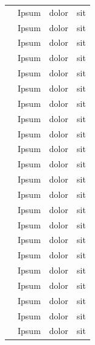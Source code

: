 \documentclass{article}
\begin{document}
\begin{longtable}{p{6.5cm}p{3.5cm}p{0.3cm}p{0.5cm}}
          \citet{Lorem}                 & Ipsum                  & dolor & sit \\
            \citet{Lorem}                 & Ipsum                  & dolor & sit \\
            \citet{Lorem}                 & Ipsum                  & dolor & sit \\
            \citet{Lorem}                 & Ipsum                  & dolor & sit \\
            \citet{Lorem}                 & Ipsum                  & dolor & sit \\
            \citet{Lorem}                 & Ipsum                  & dolor & sit \\
            \citet{Lorem}                 & Ipsum                  & dolor & sit \\
            \citet{Lorem}                 & Ipsum                  & dolor & sit \\
            \citet{Lorem}                 & Ipsum                  & dolor & sit \\
            \citet{Lorem}                 & Ipsum                  & dolor & sit \\
            \citet{Lorem}                 & Ipsum                  & dolor & sit \\
            \citet{Lorem}                 & Ipsum                  & dolor & sit \\
            \citet{Lorem}                 & Ipsum                  & dolor & sit \\
            \citet{Lorem}                 & Ipsum                  & dolor & sit \\  \citet{Lorem}                 & Ipsum                  & dolor & sit \\
            \citet{Lorem}                 & Ipsum                  & dolor & sit \\
            \citet{Lorem}                 & Ipsum                  & dolor & sit \\
            \citet{Lorem}                 & Ipsum                  & dolor & sit \\
            \citet{Lorem}                 & Ipsum                  & dolor & sit \\
            \citet{Lorem}                 & Ipsum                  & dolor & sit \\
            \citet{Lorem}                 & Ipsum                  & dolor & sit \\
            \citet{Lorem}                 & Ipsum                  & dolor & sit \\

\end{longtable}
\end{document}
